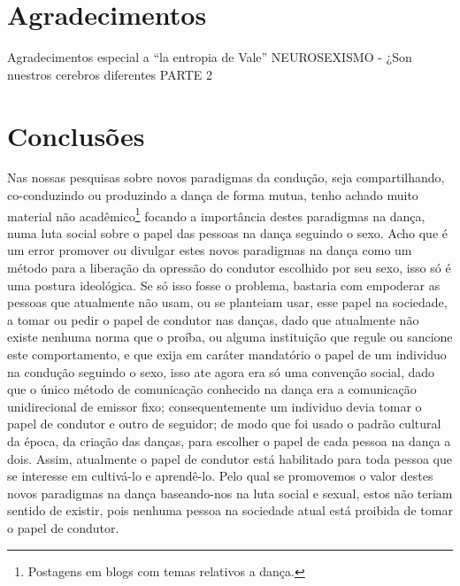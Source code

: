 \documentclass[a4paper,10pt]{article}
\begin{document}
\section{Agradecimentos}
Agradecimentos especial a ``la entropia de Vale'' 
NEUROSEXISMO - ¿Son nuestros cerebros diferentes PARTE 2
\section{Conclusões}
Nas nossas pesquisas sobre novos paradigmas da condução, seja compartilhando, 
co-conduzindo ou produzindo a dança de forma mutua, 
tenho achado muito material não 
acadêmico\footnote{Postagens em blogs com temas relativos a dança.} 
focando a importância destes paradigmas na dança, 
numa luta social sobre o papel das pessoas na dança seguindo o sexo.
Acho que é um error promover ou divulgar estes novos paradigmas na dança 
como um método para a liberação da opressão do condutor escolhido por seu sexo, 
isso só é uma postura ideológica. 
Se só isso fosse o problema, 
bastaria com empoderar as pessoas que atualmente não usam, 
ou se planteiam usar, esse papel na sociedade, 
a tomar ou pedir o papel de condutor nas danças, 
dado que atualmente não existe nenhuma norma que o proíba,
ou alguma instituição que regule ou sancione este comportamento,
e que exija em caráter mandatório o papel de um individuo na condução seguindo o sexo,
isso ate agora era só uma convenção social, 
dado que o único método de comunicação conhecido na dança era a comunicação unidirecional de emissor fixo;
consequentemente um individuo devia tomar o papel de condutor e outro de seguidor;
de modo que foi usado o padrão cultural da época, da criação das danças, 
para escolher o papel de cada pessoa na dança a dois. 
Assim,  atualmente o papel de condutor está habilitado para toda pessoa que se interesse em 
cultivá-lo e aprendê-lo. 
Pelo qual se promovemos o valor destes novos paradigmas na dança baseando-nos na luta social e sexual, 
estos não teriam sentido de existir, 
pois nenhuma pessoa na sociedade atual está proibida de tomar o papel de condutor.



\medskip
 
\printbibliography
\end{document}
